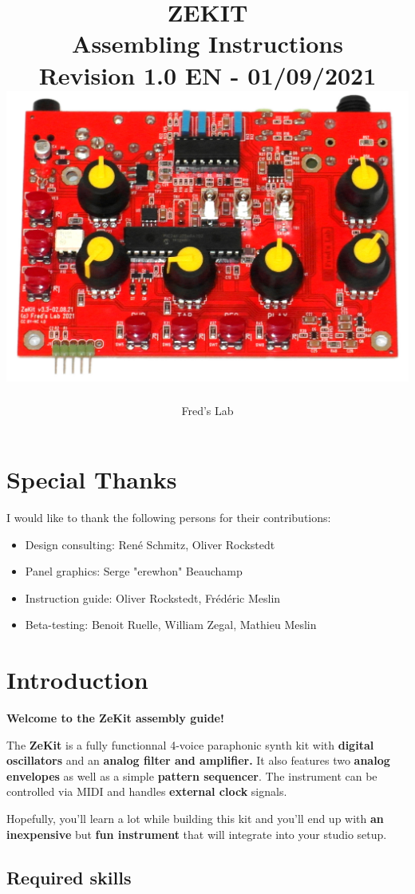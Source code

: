 \documentclass{scrartcl}
\title{
    \vspace*{4cm}
    \huge{ZEKIT} \\
    Assembling Instructions \\
    \vspace*{0.25cm}
    \small{Revision 1.0 EN - 01/09/2021} \\
    \vspace*{0.5cm}
    \includegraphics[scale=0.2]{assets/zekit-assembled.jpg}
}
\author{Fred's Lab}
\begin{document}
\maketitle

\pagebreak


\tableofcontents
\pagebreak


\section{Special Thanks}

I would like to thank the following persons for their contributions:

\begin{itemize}
    \item Design consulting: René Schmitz, Oliver Rockstedt
    \item Panel graphics: Serge "erewhon" Beauchamp 
    \item Instruction guide: Oliver Rockstedt, Frédéric Meslin
    \item Beta-testing: Benoit Ruelle, William Zegal, Mathieu Meslin
\end{itemize}


\section{Introduction}

\textbf{Welcome to the ZeKit assembly guide!}

The \textbf{ZeKit} is a fully functionnal 4-voice paraphonic synth kit with \textbf{digital oscillators} and an \textbf{analog filter and amplifier.} It also features two \textbf{analog envelopes} as well as a simple \textbf{pattern sequencer}. The instrument can be controlled via MIDI and handles \textbf{external clock} signals.

Hopefully, you'll learn a lot while building this kit and you'll end up with \textbf{an inexpensive} but \textbf{fun instrument} that will integrate into your studio setup.

\subsection{Required skills}
\end{document}
